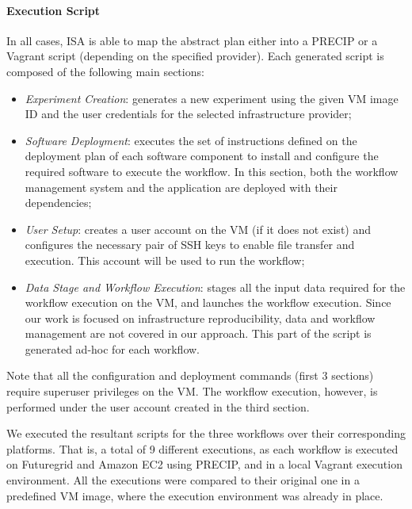 \paragraph{\textbf{Execution Script}}
In all cases, ISA is able to map the abstract plan either into a PRECIP or 
a Vagrant script (depending on the specified provider). Each generated script 
is composed of the following main sections:

\begin{itemize}
	\item \emph{Experiment Creation}: generates a new experiment using the 
		given VM image ID and the user credentials for the selected infrastructure 
		provider;
    	    
	\item \emph{Software Deployment}: executes the set of instructions defined on 
		the deployment plan of each software component to install and configure 
		the required software to execute the workflow. In this section, both the 
		workflow management system and the application are deployed with their 
		dependencies;

	\item \emph{User Setup}: creates a user account on the VM (if it does not exist) 
		and configures the necessary pair of SSH keys to enable file transfer and 
		execution. This account will be used to run the workflow;
	   
	\item \emph{Data Stage and Workflow Execution}: stages all the input data required 
		for the workflow execution on the VM, and launches the workflow execution. 
		Since our work is focused on infrastructure reproducibility, data and workflow 
		management are not covered in our approach. This part of the script is 
		generated ad-hoc for each workflow.
\end{itemize}

\noindent Note that all the configuration and deployment commands (first 3 sections) 
require superuser privileges on the VM. The workflow execution, however, is performed 
under the user account created in the third section.



We executed the resultant scripts for the three workflows over their corresponding 
platforms. That is, a total of 9 different executions, as each workflow is executed on  
Futuregrid and Amazon EC2 using PRECIP, and in a local Vagrant execution 
environment. All the executions were compared to their original one in a predefined 
VM image, where the execution environment was already in place.

